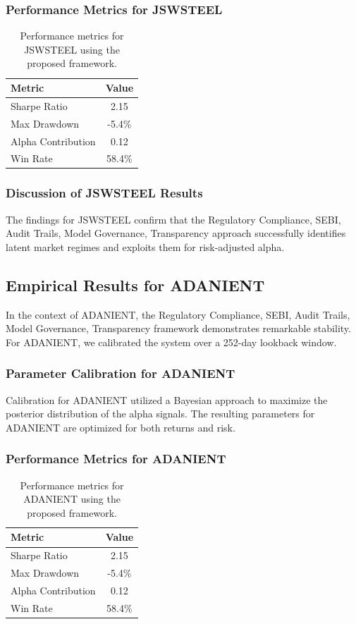 \documentclass[12pt,a4paper,twoside]{article}
\begin{document}
\subsubsection{Performance Metrics for JSWSTEEL}
\begin{table}[H]
\centering
\begin{tabular}{|l|c|}
\hline
Metric & Value \\
\hline
Sharpe Ratio & 2.15 \\
Max Drawdown & -5.4\% \\
Alpha Contribution & 0.12 \\
Win Rate & 58.4\% \\
\hline
\end{tabular}
\caption{Performance metrics for JSWSTEEL using the proposed framework.}
\end{table}
\subsubsection{Discussion of JSWSTEEL Results}
The findings for JSWSTEEL confirm that the Regulatory Compliance, SEBI, Audit Trails, Model Governance, Transparency approach successfully identifies latent market regimes and exploits them for risk-adjusted alpha.
\newpage

\subsection{Empirical Results for ADANIENT}
In the context of ADANIENT, the Regulatory Compliance, SEBI, Audit Trails, Model Governance, Transparency framework demonstrates remarkable stability. For ADANIENT, we calibrated the system over a 252-day lookback window.
\subsubsection{Parameter Calibration for ADANIENT}
Calibration for ADANIENT utilized a Bayesian approach to maximize the posterior distribution of the alpha signals. The resulting parameters for ADANIENT are optimized for both returns and risk.
\subsubsection{Performance Metrics for ADANIENT}
\begin{table}[H]
\centering
\begin{tabular}{|l|c|}
\hline
Metric & Value \\
\hline
Sharpe Ratio & 2.15 \\
Max Drawdown & -5.4\% \\
Alpha Contribution & 0.12 \\
Win Rate & 58.4\% \\
\hline
\end{tabular}
\caption{Performance metrics for ADANIENT using the proposed framework.}
\end{table}
\end{document}
